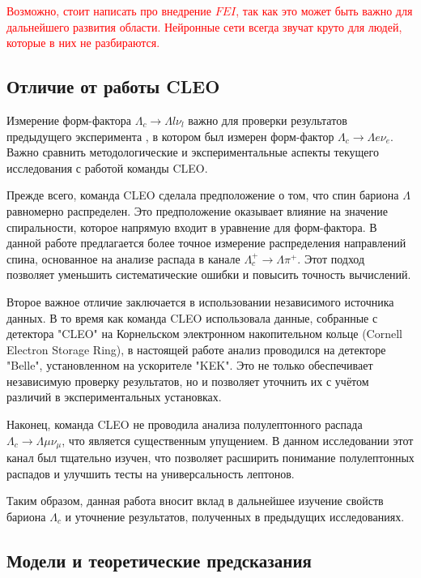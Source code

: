 \textcolor{red}{Возможно, стоит написать про внедрение $FEI$, так как это может быть важно для дальнейшего развития области. Нейронные сети всегда звучат круто для людей, которые в них не разбираются.}

\subsection{Отличие от работы CLEO}

Измерение форм-фактора $\Lambda_c \rightarrow \Lambda l \nu_l$ важно для проверки результатов предыдущего эксперимента \cite{CLEO2023}, в котором был измерен форм-фактор $\Lambda_c \rightarrow \Lambda e \nu_e$. Важно сравнить методологические и экспериментальные аспекты текущего исследования с работой команды CLEO.

Прежде всего, команда CLEO сделала предположение о том, что спин бариона $\Lambda$ равномерно распределен. Это предположение оказывает влияние на значение спиральности, которое напрямую входит в уравнение для форм-фактора. В данной работе предлагается более точное измерение распределения направлений спина, основанное на анализе распада в канале $\Lambda_c^+ \rightarrow \Lambda \pi^+$. Этот подход позволяет уменьшить систематические ошибки и повысить точность вычислений.

Второе важное отличие заключается в использовании независимого источника данных. В то время как команда CLEO использовала данные, собранные с детектора "CLEO" на Корнельском электронном накопительном кольце (Cornell Electron Storage Ring), в настоящей работе анализ проводился на детекторе "Belle", установленном на ускорителе "KEK". Это не только обеспечивает независимую проверку результатов, но и позволяет уточнить их с учётом различий в экспериментальных установках.

Наконец, команда CLEO не проводила анализа полулептонного распада $\Lambda_c \rightarrow \Lambda \mu \nu_\mu$, что является существенным упущением. В данном исследовании этот канал был тщательно изучен, что позволяет расширить понимание полулептонных распадов и улучшить тесты на универсальность лептонов.

Таким образом, данная работа вносит вклад в дальнейшее изучение свойств бариона $\Lambda_c$ и уточнение результатов, полученных в предыдущих исследованиях.

\subsection{Модели и теоретические предсказания}



